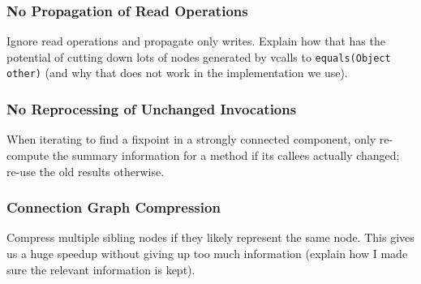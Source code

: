			\subsubsection{No Propagation of Read Operations}
				\label{subsub:ea:improvements:opt:writeonly}
				Ignore read operations and propagate only writes. Explain how that has the potential of cutting down lots of
				nodes generated by vcalls to \texttt{equals(Object other)} (and why that does not work in the implementation we
				use).

			\subsubsection{No Reprocessing of Unchanged Invocations}
				\label{subsub:ea:improvements:opt:quick-fixpoint}
				When iterating to find a fixpoint in a strongly connected component, only re-compute the summary information for
				a method if its callees actually changed; re-use the old results otherwise.

			\subsubsection{Connection Graph Compression}
				\label{subsub:ea:improvements:opt:compression}
				Compress multiple sibling nodes if they likely represent the same node. This gives us a huge speedup without
				giving up too much information (explain how I made sure the relevant information is kept).
